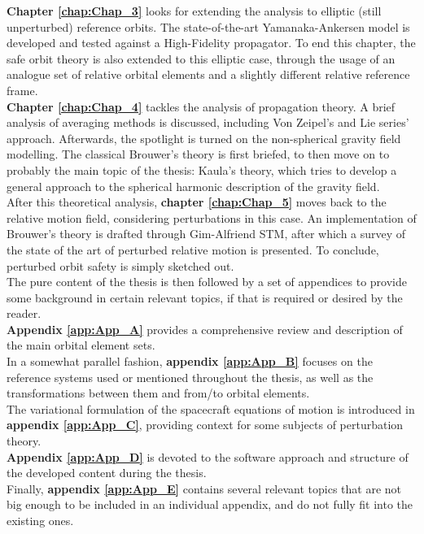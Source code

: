 %
\indent \textbf{Chapter \ref{chap:Chap_3}} looks for extending the analysis to elliptic (still unperturbed) reference orbits. The state-of-the-art Yamanaka-Ankersen model is developed and tested against a High-Fidelity propagator. To end this chapter, the safe orbit theory is also extended to this elliptic case, through the usage of an analogue set of relative orbital elements and a slightly different relative reference frame. \\
%
\indent \textbf{Chapter \ref{chap:Chap_4}} tackles the analysis of propagation theory. A brief analysis of averaging methods is discussed, including Von Zeipel's and Lie series' approach. Afterwards, the spotlight is turned on the non-spherical gravity field modelling. The classical Brouwer's theory is first briefed, to then move on to probably the main topic of the thesis: Kaula's theory, which tries to develop a general approach to the spherical harmonic description of the gravity field.\\
%
\indent After this theoretical analysis, \textbf{chapter \ref{chap:Chap_5}} moves back to the relative motion field, considering perturbations in this case. An implementation of Brouwer's theory is drafted through Gim-Alfriend STM, after which a survey of the state of the art of perturbed relative motion is presented. To conclude, perturbed orbit safety is simply sketched out.\\
%
\indent The pure content of the thesis is then followed by a set of appendices to provide some background in certain relevant topics, if that is required or desired by the reader. \\
%
\indent \textbf{Appendix \ref{app:App_A}} provides a comprehensive review and description of the main orbital element sets. \\
%
\indent In a somewhat parallel fashion, \textbf{appendix \ref{app:App_B}} focuses on the reference systems used or mentioned throughout the thesis, as well as the transformations between them and from/to orbital elements.\\
%
\indent The variational formulation of the spacecraft equations of motion is introduced in \textbf{appendix \ref{app:App_C}}, providing context for some subjects of perturbation theory. \\
%
\indent \textbf{Appendix \ref{app:App_D}} is devoted to the software approach and structure of the developed content during the thesis.\\
%
\indent Finally, \textbf{appendix \ref{app:App_E}} contains several relevant topics that are not big enough to be included in an individual appendix, and do not fully fit into the existing ones.\\
